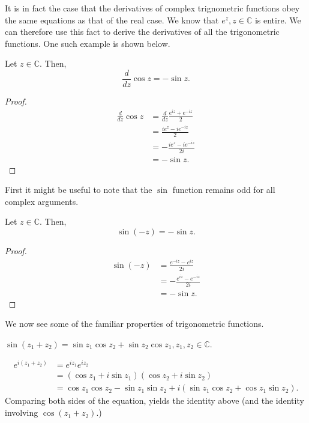 \documentclass[12pt]{book}
\begin{document}
It is in fact the case that the derivatives of complex trignometric functions obey the same equations as that of the real case. We know that $e^{z}, z \in \mathbb{C}$ is entire. We can therefore use this fact to derive the derivatives of all the trigonometric functions. One such example is shown below.

\begin{thm}
    Let $z \in \mathbb{C}.$ Then,
    \[
        \frac{d}{dz} \cos z = -\sin z.
    \]
\end{thm}
\begin{proof}
    \begin{align*}
        \frac{d}{dz} \cos z
            &=
                \frac{d}{dz} \frac{e^{iz} + e^{-iz}}{2} \\
            &=
                \frac{ie^{z} - ie^{-iz}}{2} \\
            &=
                - \frac{ie^{z} - ie^{-iz}}{2i} \\
            &=
                - \sin z.
    \end{align*}
\end{proof}

First it might be useful to note that the $\sin$ function remains odd for all complex arguments.

\begin{thm}
    Let $z \in \mathbb{C}.$ Then,
    \[
        \sin(-z) = -\sin z.
    \]
\end{thm}
\begin{proof}
    \begin{align*}
        \sin(-z)
            &=
                \frac{e^{-iz} - e^{iz}}{2i} \\
            &=
                - \frac{e^{iz} - e^{-iz}}{2i} \\
            &=
                - \sin z.
    \end{align*}
\end{proof}

We now see some of the familiar properties of trigonometric functions.

\begin{exmp}
    $\sin(z_1 + z_ 2) = \sin z_1 \cos z_2 + \sin z_2 \cos z_1, z_1, z_2 \in \mathbb{C}.$
\end{exmp}

\begin{align*}
    e^{i(z_1 + z_2)}
        &=
            e^{iz_1} e^{iz_2} \\
        &=
            (\cos z_1 + i\sin z_1) (\cos z_2 + i\sin z_2) \\
        &=
            \cos z_1 \cos z_2 - \sin z_1 \sin z_2+ i(\sin z_1 \cos z_2 + \cos z_1 \sin z_2).
\end{align*}
Comparing both sides of the equation, yields the identity above (and the identity involving $\cos(z_1 + z_2).$)
\end{document}
